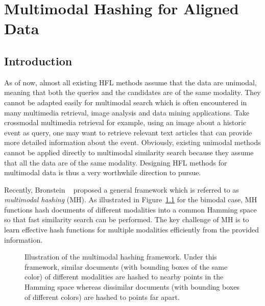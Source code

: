 
\chapter{Multimodal Hashing for Aligned Data}
\label{chap:smh}

\section{Introduction}

As of now, almost all existing \mbox{HFL} methods assume that the data are unimodal, meaning that both the queries and the candidates are of the same modality. They cannot be adapted easily for multimodal search which is often encountered in many multimedia retrieval, image analysis and data mining applications. Take crossmodal multimedia retrieval for example, using an image about a historic event as query, one may want to retrieve relevant text articles that can provide more detailed information about the event. Obviously, existing unimodal methods cannot be applied directly to multimodal similarity search because they assume that all the data are of the same modality.  Designing \mbox{HFL} methods for multimodal data is thus a very worthwhile direction to pursue.

Recently, \mbox{Bronstein} \etal~\cite{bronstein2010cvpr} proposed a general framework which is referred to as \textit{multimodal hashing} (\mbox{MH}). As illustrated in Figure~\ref{smh:fig:framework} for the bimodal case, \mbox{MH} functions hash documents of different modalities into a common Hamming space so that fast similarity search can be performed. The key challenge of \mbox{MH} is to learn effective hash functions for multiple modalities efficiently from the provided information.

\begin{figure}[htb]
\centering
{}
\caption{Illustration of the multimodal hashing framework. Under this framework, similar documents (with bounding boxes of the same color) of different modalities are hashed to nearby points in the Hamming space whereas dissimilar documents (with bounding boxes of different colors) are hashed to points far apart.}
\label{smh:fig:framework}
\end{figure}

